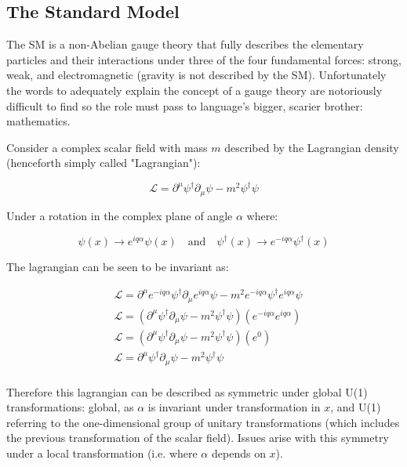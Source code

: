 \documentclass[12pt,a4paper,epsf,portrait,times,epsfig]{article}
\begin{document}

	\subsection{The Standard Model}

	The SM is a non-Abelian gauge theory that fully describes the elementary particles and their interactions under three of the four fundamental forces: strong, weak, and electromagnetic (gravity is not described by the SM). Unfortunately the words to adequately explain the concept of a gauge theory are notoriously difficult to find so the role must pass to language's bigger, scarier brother: mathematics. \par

	Consider a complex scalar field with mass $m$ described by the Lagrangian density (henceforth simply called "Lagrangian"):

	\begin{equation}
		\mathcal{L} = \partial^{\mu} \psi^{\dagger} \partial_{\mu} \psi - m^{2}\psi^{\dagger}\psi
	\end{equation}

	Under a rotation in the complex plane of angle $\alpha$ where:

	\begin{equation}
		\psi(x) \rightarrow e^{iq\alpha}\psi(x)  
		\quad\mathrm{and}\quad
		\psi^{\dagger}(x) \rightarrow e^{-iq\alpha}\psi^{\dagger}(x)
	\end{equation}

	The lagrangian can be seen to be invariant as:

	\begin{equation}
		\begin{split}
		&\mathcal{L} = \partial^{\mu}  e^{-iq\alpha} \psi^{\dagger} \partial_{\mu} e^{iq\alpha} \psi  - m^{2}e^{-iq\alpha} \psi^{\dagger} e^{iq\alpha}\psi  \\
		&\mathcal{L} = (\partial^{\mu} \psi^{\dagger} \partial_{\mu} \psi - m^{2}\psi^{\dagger}\psi)(e^{-iq\alpha}e^{iq\alpha}) \\ 
		&\mathcal{L} = (\partial^{\mu} \psi^{\dagger} \partial_{\mu} \psi - m^{2}\psi^{\dagger}\psi)(e^{0}) \\
		&\mathcal{L} = \partial^{\mu} \psi^{\dagger} \partial_{\mu} \psi - m^{2}\psi^{\dagger}\psi \\
		\end{split}
	\end{equation}

	Therefore this lagrangian can be described as symmetric under global U(1) transformations: global, as $\alpha$ is invariant under transformation in $x$, and U(1) referring to the one-dimensional group of unitary transformations (which includes the previous transformation of the scalar field). Issues arise with this symmetry under a local transformation (i.e. where $\alpha$ depends on $x$). 
\end{document}
